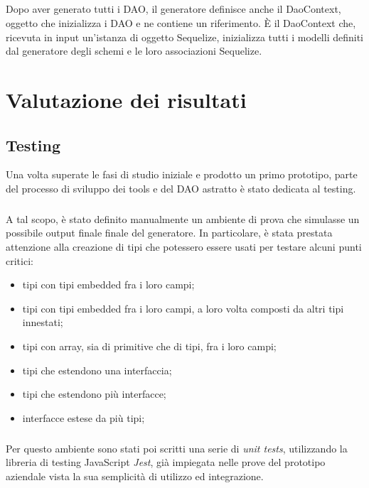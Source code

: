 \documentclass[a4paper, 12pt]{report}
\begin{document}
      \paragraph*{}
      Dopo aver generato tutti i DAO, il generatore definisce anche il DaoContext, oggetto che inizializza i DAO e ne contiene un riferimento.
      È il DaoContext che, ricevuta in input un'istanza di oggetto Sequelize, inizializza tutti i modelli definiti dal generatore degli schemi e le loro associazioni Sequelize. 
    \newpage
    \chapter{Valutazione dei risultati}
      \section{Testing}
        Una volta superate le fasi di studio iniziale e prodotto un primo prototipo, parte del processo di sviluppo dei tools e del DAO astratto è stato dedicata al testing.
        \paragraph*{}
          A tal scopo, è stato definito manualmente un ambiente di prova che simulasse un possibile output finale finale del generatore.
          In particolare, è stata prestata attenzione alla creazione di tipi che potessero essere usati per testare alcuni punti critici:
          \begin{itemize}
            \item tipi con tipi embedded fra i loro campi;
            \item tipi con tipi embedded fra i loro campi, a loro volta composti da altri tipi innestati;
            \item tipi con array, sia di primitive che di tipi, fra i loro campi;
            \item tipi che estendono una interfaccia;
            \item tipi che estendono più interfacce;
            \item interfacce estese da più tipi;
          \end{itemize}
        \paragraph*{}
          Per questo ambiente sono stati poi scritti una serie di \emph{unit tests}, utilizzando la libreria di testing JavaScript \emph{Jest}, già impiegata nelle prove del prototipo aziendale vista la sua semplicità di utilizzo ed integrazione.
\end{document}
